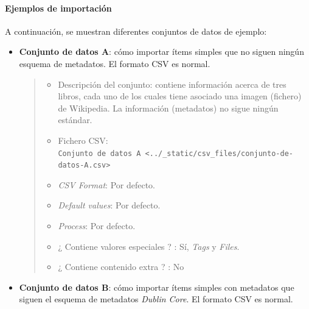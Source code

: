 \documentclass[
]{article}
\providecommand{\tightlist}{%
  \setlength{\itemsep}{0pt}\setlength{\parskip}{0pt}}
\begin{document}
\hypertarget{ejemplos-de-importaciuxf3n}{%
\paragraph{Ejemplos de importación}\label{ejemplos-de-importaciuxf3n}}

A continuación, se muestran diferentes conjuntos de datos de ejemplo:

\begin{itemize}
\item
  \textbf{Conjunto de datos A}: cómo importar ítems simples que no
  siguen ningún esquema de metadatos. El formato CSV es normal.

  \begin{quote}
  \begin{itemize}
  \tightlist
  \item
    Descripción del conjunto: contiene información acerca de tres
    libros, cada uno de los cuales tiene asociado una imagen (fichero)
    de Wikipedia. La información (metadatos) no sigue ningún estándar.
  \item
    Fichero CSV:
    \texttt{Conjunto\ de\ datos\ A\ \textless{}../\_static/csv\_files/conjunto-de-datos-A.csv\textgreater{}}
  \item
    \emph{CSV Format}: Por defecto.
  \item
    \emph{Default values}: Por defecto.
  \item
    \emph{Process}: Por defecto.
  \item
    ¿ Contiene valores especiales ? : Sí, \emph{Tags} y \emph{Files}.
  \item
    ¿ Contiene contenido extra ? : No
  \end{itemize}
  \end{quote}
\item
  \textbf{Conjunto de datos B}: cómo importar ítems simples con
  metadatos que siguen el esquema de metadatos \emph{Dublin Core}. El
  formato CSV es normal.


\end{itemize}
\end{document}
